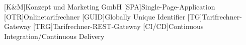 \begin{acronym}
	
	[K\&M]{Konzept und Marketing GmbH}
	[SPA]{Single-Page-Application}
	[OTR]{Onlinetarifrechner}
	[GUID]{Globally Unique Identifier}
	[TG]{Tarifrechner-Gateway}
	[TRG]{Tarifrechner-REST-Gateway}
	[CI/CD]{Continuous Integration/Continuous Delivery}
\end{acronym}